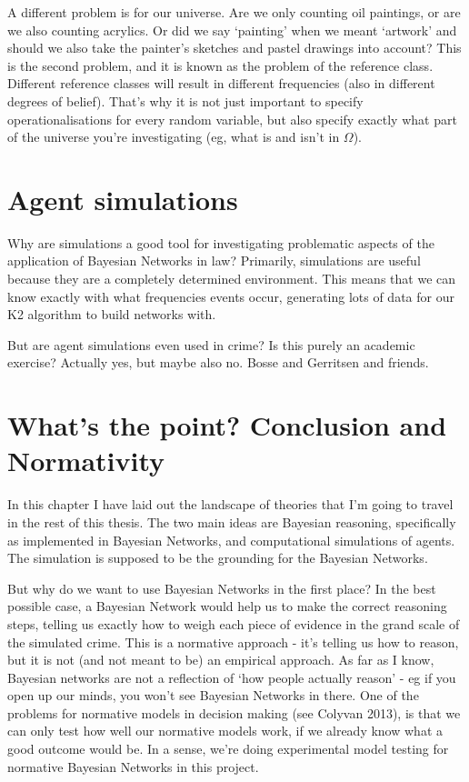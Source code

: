 A different problem is for our universe. Are we only counting oil paintings, or are we also counting acrylics. Or did we say `painting' when we meant `artwork' and should we also take the painter's sketches and pastel drawings into account? This is the second problem, and it is known as the problem of the reference class. Different reference classes will result in different frequencies (also in different degrees of belief). That's why it is not just important to specify operationalisations for every random variable, but also specify exactly what part of the universe you're investigating (eg, what is and isn't in $\Omega$).


\section{Agent simulations}
Why are simulations a good tool for investigating problematic aspects of the application of Bayesian Networks in law? Primarily, simulations are useful because they are a completely determined environment. This means that we can know exactly with what frequencies events occur, generating lots of data for our K2 algorithm to build networks with.

But are agent simulations even used in crime? Is this purely an academic exercise? Actually yes, but maybe also no.
Bosse and Gerritsen and friends.

\section{What's the point? Conclusion and Normativity}

In this chapter I have laid out the landscape of theories that I'm going to travel in the rest of this thesis. The two main ideas are Bayesian reasoning, specifically as implemented in Bayesian Networks, and computational simulations of agents. The simulation is supposed to be the grounding for the Bayesian Networks.

But why do we want to use Bayesian Networks in the first place? In the best possible case, a Bayesian Network would help us to make the correct reasoning steps, telling us exactly how to weigh each piece of evidence in the grand scale of the simulated crime. This is a normative approach - it's telling us how to reason, but it is not (and not meant to be) an empirical approach. As far as I know, Bayesian networks are not a reflection of `how people actually reason' - eg if you open up our minds, you won't see Bayesian Networks in there. One of the problems for normative models in decision making (see Colyvan 2013), is that we can only test how well our normative models work, if we already know what a good outcome would be. In a sense, we're doing experimental model testing for normative Bayesian Networks in this project.

 




